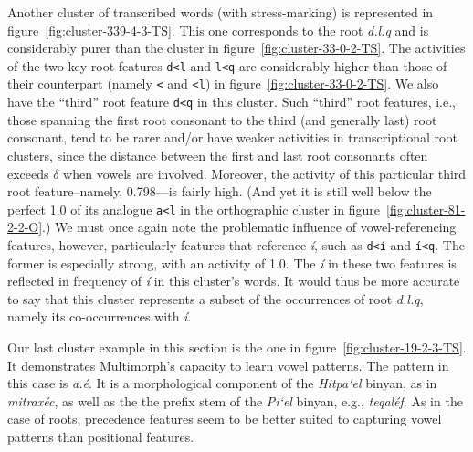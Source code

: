 Another cluster of transcribed words (with stress-marking) is represented in figure~\ref{fig:cluster-339-4-3-TS}. 
This one corresponds to the root \textit{d.l.q} and is considerably purer than the 
cluster in figure~\ref{fig:cluster-33-0-2-TS}. The activities of the two key root features \texttt{d<l} and \texttt{l<q} are considerably higher than those of their counterpart (namely \texttt{<} and \texttt{<l}) in figure~\ref{fig:cluster-33-0-2-TS}. We also have the ``third'' root feature \texttt{d<q} in this cluster. Such ``third'' root features, i.e., those spanning the first root consonant to the third (and generally last) root consonant, tend to be rarer and/or have weaker activities in transcriptional root clusters,
since the distance between the first and last root consonants often exceeds $\delta$ when vowels are 
involved. Moreover, the activity of this particular third root feature--namely, 0.798---is fairly high. (And yet it is still well below the perfect 1.0 of its analogue \texttt{a<l} in the orthographic cluster in figure~\ref{fig:cluster-81-2-2-O}.)
We must once again note the problematic influence of vowel-referencing features, however, particularly features that
reference \textit{\'{i}}, such as \texttt{d<\'{i}} and \texttt{\'{i}<q}.
The former is especially strong, with an activity of 1.0.  %
 The \textit{\'{i}} in these two features is reflected in frequency of \textit{\'{i}} in 
this cluster's words. It would thus be more accurate to say that this cluster represents a subset of the 
occurrences of root \textit{d.l.q}, namely its co-occurrences with \textit{\'{i}}.

Our last cluster example in this section is the one in figure~\ref{fig:cluster-19-2-3-TS}. It demonstrates 
Multimorph's capacity to learn vowel patterns. The pattern in this case is \textit{a.\'{e}}.
 It is a morphological component of the \textit{Hitpa`el} binyan, 
as in \textit{mitrax\'{e}c}, as well as the 
the prefix stem of the \textit{Pi`el} binyan,
e.g., \textit{teqal\'{e}f}.
As in the case of roots, precedence features seem to be better suited to capturing vowel patterns than positional features.

